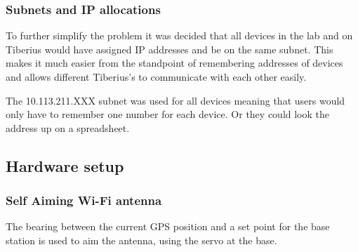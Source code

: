 \subsubsection{Subnets and IP allocations}
To further simplify the problem it was decided that all devices in the lab and on Tiberius would have assigned IP addresses and be on the same subnet. This makes it much easier from the standpoint of remembering addresses of devices and allows different Tiberius's to communicate with each other easily. 

The 10.113.211.XXX subnet was used for all devices meaning that users would only have to remember one number for each device. Or they could look the address up on a spreadsheet.

\subsection{Hardware setup}
\subsubsection{Self Aiming Wi-Fi antenna}
The bearing between the current GPS position and a set point for the base station is used to aim the antenna, using the servo at the base.



